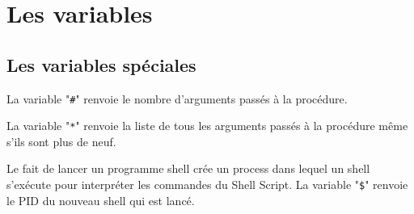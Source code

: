 %
%

\setcounter{remarque-cnt}{1}
\setcounter{example-cnt}{1}
\chapter{Les variables}
\thispagestyle{fancy}

\section{\label{variables-special-var}Les variables sp{\'e}ciales}

La variable "\verb=#="  renvoie le
nombre d'arguments pass{\'e}s {\`a} la proc{\'e}dure.

La variable "\verb=*=" renvoie la liste
de tous les arguments pass{\'e}s {\`a} la proc{\'e}dure m{\^e}me s'ils
sont plus de neuf.

Le fait de lancer un programme shell cr{\'e}e un process dans lequel un
shell s'ex{\'e}cute pour interpr{\'e}ter les commandes du Shell Script.
La variable "\verb=$=" renvoie le PID
du nouveau shell qui est lanc{\'e}.


